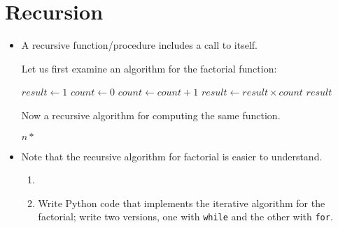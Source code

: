 \documentclass[a4paper]{article}
\begin{document}
{\begin{itemize}
\end{itemize}
\hrulefill

\section{Recursion}

\begin{itemize}

\item A recursive function/procedure includes a call to itself. 

\begin{uexample}

Let us first examine an  algorithm for the factorial function:

\begin{ucodeframe}
\vspace{1em}
\begin{algorithmic}
\State $result \gets 1$
\State $count \gets 0$
		\State $count \gets count + 1$
		\State $result \gets result \times count$
	\EndWhile
\State \Return $result$
\EndFunction
\end{algorithmic}
\end{ucodeframe}

Now a recursive algorithm for computing the same function.

\begin{ucodeframe}
\vspace{1em}
\begin{algorithmic}
\State {}
\Else
\State \Return $n*$ 
\EndIf
\EndFunction
\end{algorithmic}

\end{ucodeframe}

\end{uexample}

\item Note that the recursive algorithm for factorial is easier to understand. 

\hrulefill
\begin{uexercise}
\begin{enumerate}
\item[]
\item Write Python code that implements the iterative algorithm for
the factorial; write two versions, one with \Verb+while+ and the other with
\Verb+for+.


\end{enumerate}
\end{uexercise}
\end{itemize}}
\end{document}
